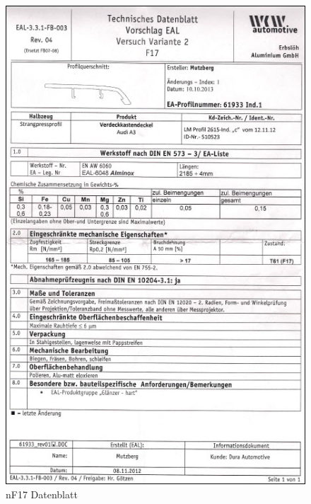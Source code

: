 \documentclass[12pt,a4paper,parskip]{scrartcl}
\begin{document}
\begin{figure}[hbtp]
\centering
\includegraphics[width=1\textwidth]{nF17Datenblatt.jpg}
\caption{nF17 Datenblatt}
\end{figure}
\end{document}
